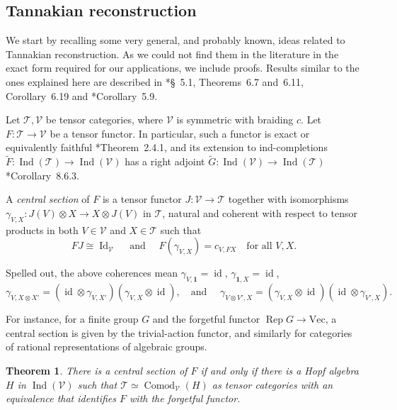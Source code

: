 \documentclass[11pt]{amsart}
\newcommand\Cref[1]{\zcref[S]{#1}}
\newtheorem{theorem}{Theorem}[section]
\theoremstyle{definition}
\theoremstyle{remark}
\newcommand\cC{\mathcal C}
\newcommand\cT{\mathcal T}
\newcommand\cV{\mathcal V}
\newcommand\Rep{\operatorname{Rep}}
\newcommand\Id{\operatorname{Id}}
\newcommand\id{\operatorname{id}}
\newcommand\Ind{\operatorname{Ind}}
\newcommand\Comod{\operatorname{Comod}}
\renewcommand\:\colon
\renewcommand\o\otimes
\newcommand\one{\mathbf{1}}
\renewcommand\Vec{\mathrm{Vec}}
\renewcommand\o\otimes
\renewcommand\:\colon
\begin{document}


\subsection{Tannakian reconstruction} \label{ss:tannaka-duality}

We start by recalling some very general, and probably known, ideas related to Tannakian reconstruction. As we could not find them in the literature in the exact form required for our applications, we include proofs. Results similar to the ones explained here are described in \cite{LM}*{\S~5.1, Theorems~6.7 and~6.11, Corollary~6.19} and \cite{BLV}*{Corollary~5.9}.

Let $\cT,\cV$ be tensor categories, where $\cV$ is symmetric with braiding $c$. Let $F\:\cT\to\cV$ be a tensor functor. In particular, such a functor is exact or equivalently faithful \cite{CEOP}*{Theorem~2.4.1}, and its extension to ind-completions $\tilde F\:\Ind(\cT)\to\Ind(\cV)$ has a right adjoint $\tilde G\:\Ind(\cV)\to\Ind(\cT)$ \cite{KS}*{Corollary~8.6.3}.

\begin{definition} A \emph{central section} of $F$ is a tensor functor $J\:\cV\to\cT$ together with isomorphisms $\gamma_{V,X}\: J(V)\o X\to X\o J(V)$ in $\cT$, natural and coherent with respect to tensor products in both $V\in\cV$ and $X\in\cT$ such that
$$
FJ \cong \Id_\cV 
\quad\text{ and }\quad
F(\gamma_{V,X}) = c_{V,FX} \quad
\text{for all }V,X.
$$
\end{definition}

Spelled out, the above coherences mean $\gamma_{V,\one}=\id$, $\gamma_{\one,X}=\id$, 
$$
\gamma_{V,X\o X'} = (\id\o\gamma_{V,X'})(\gamma_{V,X}\o\id) ,
\quad\text{and }\quad
\gamma_{V\o V',X} = (\gamma_{V,X}\o\id)(\id\o\gamma_{V',X}) .
$$

For instance, for a finite group $G$ and the forgetful functor $\Rep G\to\Vec$, a central section is given by the trivial-action functor, and similarly for categories of rational representations of algebraic groups. 

\begin{theorem} \label{thm:rec-1} There is a central section of $F$ if and only if there is a Hopf algebra $H$ in $\Ind(\cV)$ such that $\cT\simeq\Comod_\cV(H)$ as tensor categories with an equivalence that identifies $F$ with the forgetful functor.
\end{theorem}
\end{document}
